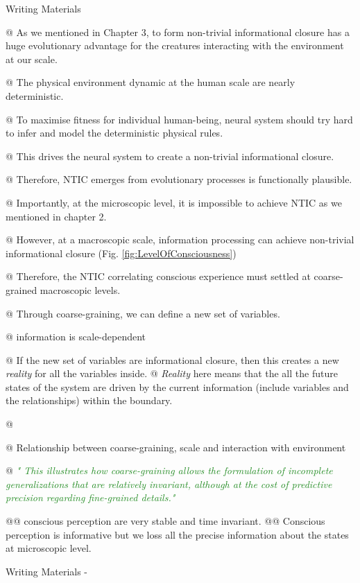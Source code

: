 \documentclass[utf8]{article}
\newenvironment{WritingMaterials} %
    	{
            \begin{tcolorbox}[enhanced,
                title=-,
                size=small,
                colbacktitle=Aquamarine,
                drop fuzzy shadow,
                fontupper=\small,
                boxrule=0.4pt,
                colback=Aquamarine!10!white,
                sharp corners]
                Writing Materials
            \end{tcolorbox}
            \begin{easylist}[itemize]
    	}
    	{
            \end{easylist}  
            \begin{tcolorbox}[enhanced,
                halign=flush right,
                halign title=right,
                size=small,
                colbacktitle=Aquamarine,
                drop fuzzy shadow,
                fontupper=\small,
                boxrule=0.4pt,
                colback=Aquamarine,
                colupper=White,
                sharp corners]
                Writing Materials -
            \end{tcolorbox}        
    	}
\newcommand{\rewrite}[1]{\textcolor{ForestGreen}{\textit{"#1"}}\newline}
\newcommand{\needref}[1]{%
			\ifthenelse{\equal{#1}{}}{%
				\todo[color=White, linecolor=Orange, bordercolor=Orange]{\textcolor{Orange}{Ref}}}{%
				\todo[color=White, linecolor=Orange, bordercolor=Orange]{\textcolor{Orange}{Ref: #1}}%
			}%
		}
\begin{document}
		\begin{WritingMaterials}
		
        @ As we mentioned in Chapter 3, to form non-trivial informational closure has a huge evolutionary advantage for the creatures interacting with the environment at our scale. 
        
        @ The physical environment dynamic at the human scale are nearly deterministic.\needref{Do we need ref here?}
        
		@ To maximise fitness for individual human-being, neural system should try hard to infer and model the deterministic physical rules.

		@ This drives the neural system to create a non-trivial informational closure.
		
        @ Therefore, NTIC emerges from evolutionary processes is functionally plausible. 
        
        @ Importantly, at the microscopic level, it is impossible to achieve NTIC as we mentioned in chapter 2.

		@ However, at a macroscopic scale, information processing can achieve non-trivial informational closure (Fig. \ref{fig:LevelOfConsciousness})
        
        @ Therefore, the NTIC correlating conscious experience must settled at coarse-grained macroscopic levels.
        
		@ Through coarse-graining, we can define a new set of variables.

        @ information is scale-dependent
        
		@ If the new set of variables are informational closure, then this creates a new \textit{reality} for all the variables inside.        
		@ \textit{Reality} here means that the all the future states of the system are driven by the current information (include variables and the relationships) within the boundary. 
			
        @
        
        @ Relationship between coarse-graining, scale and interaction with environment
        
        
		@ \rewrite{
			This illustrates how coarse-graining allows the formulation of incomplete generalizations that are relatively invariant, although at the cost of predictive precision regarding fine-grained details.} \cite{price2007causation}

			@@ conscious perception are very stable and time invariant.
			@@ Conscious perception is informative but we loss all the precise information about the states at microscopic level.        
        

\end{WritingMaterials}
\end{document}
